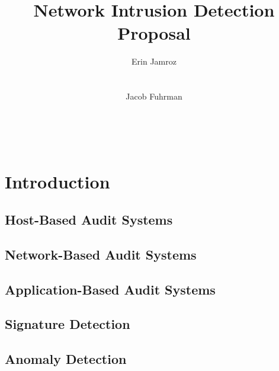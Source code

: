 \documentclass{acm_proc_article-sp}
\begin{document}
\title{Network Intrusion Detection Proposal}

\author{
\alignauthor
Erin Jamroz
       \\
       \\
       \\
\alignauthor
Jacob Fuhrman
       \\
       \\
       \\
       \\       
}

\maketitle

\begin{abstract}

\end{abstract}


\section{Introduction}
    \subsection{Host-Based Audit Systems}
    \subsection{Network-Based Audit Systems}
    \subsection{Application-Based Audit Systems}
    \subsection{Signature Detection}
    \subsection{Anomaly Detection}
\end{document}
